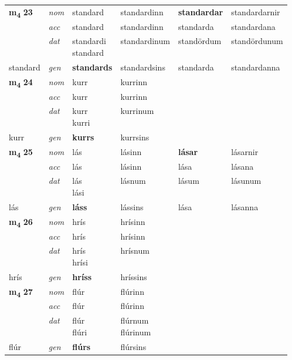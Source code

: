 \begin{longtable}[l]{X>{\footnotesize\itshape}XXXXX}
\multirow{3}{*}{{{\textbf{m{\textsubscript{4}}} \Large{\textbf{23}}}}} & nom & standard & standardinn & \textbf{standardar} & standardarnir \\*
 & acc & standard & standardinn & standarda & standardana \\*
 & dat & \specialcell{standardi\\ standard} & standardinum & standördum & standördunum \\*
 {\footnotesize{standard}} & gen & \textbf{standards} & standardsins & standarda & standardanna \\
\midrule

\multirow{3}{*}{{{\textbf{m{\textsubscript{4}}} \Large{\textbf{24}}}}} & nom & kurr & kurrinn & \textbf{} &  \\*
 & acc & kurr & kurrinn &  &  \\*
 & dat & \specialcell{kurr\\ kurri} & kurrinum &  &  \\*
 {\footnotesize{kurr}} & gen & \textbf{kurrs} & kurrsins &  &  \\
\midrule

\multirow{3}{*}{{{\textbf{m{\textsubscript{4}}} \Large{\textbf{25}}}}} & nom & lás & lásinn & \textbf{lásar} & lásarnir \\*
 & acc & lás & lásinn & lása & lásana \\*
 & dat & \specialcell{lás\\ lási} & lásnum & lásum & lásunum \\*
 {\footnotesize{lás}} & gen & \textbf{láss} & lássins & lása & lásanna \\
\midrule

\multirow{3}{*}{{{\textbf{m{\textsubscript{4}}} \Large{\textbf{26}}}}} & nom & hrís & hrísinn & \textbf{} &  \\*
 & acc & hrís & hrísinn &  &  \\*
 & dat & \specialcell{hrís\\ hrísi} & hrísnum &  &  \\*
 {\footnotesize{hrís}} & gen & \textbf{hríss} & hríssins &  &  \\
\midrule

\multirow{3}{*}{{{\textbf{m{\textsubscript{4}}} \Large{\textbf{27}}}}} & nom & flúr & flúrinn & \textbf{} &  \\*
 & acc & flúr & flúrinn &  &  \\*
 & dat & \specialcell{flúr\\ flúri} & \specialcell{flúrnum\\ flúrinum} &  &  \\*
 {\footnotesize{flúr}} & gen & \textbf{flúrs} & flúrsins &  &  \\
\midrule


\end{longtable}
